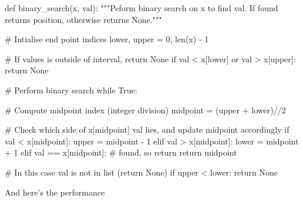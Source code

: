 \documentclass[
  letterpaper,
  DIV=11,
  numbers=noendperiod]{scrreprt}
\newenvironment{Shaded}{\begin{snugshade}}{\end{snugshade}}
\newcommand{\BuiltInTok}[1]{\textcolor[rgb]{0.00,0.23,0.31}{#1}}
\newcommand{\CommentTok}[1]{\textcolor[rgb]{0.37,0.37,0.37}{#1}}
\newcommand{\ControlFlowTok}[1]{\textcolor[rgb]{0.00,0.23,0.31}{#1}}
\newcommand{\DecValTok}[1]{\textcolor[rgb]{0.68,0.00,0.00}{#1}}
\newcommand{\KeywordTok}[1]{\textcolor[rgb]{0.00,0.23,0.31}{#1}}
\newcommand{\NormalTok}[1]{\textcolor[rgb]{0.00,0.23,0.31}{#1}}
\newcommand{\OperatorTok}[1]{\textcolor[rgb]{0.37,0.37,0.37}{#1}}
\newcommand{\VariableTok}[1]{\textcolor[rgb]{0.07,0.07,0.07}{#1}}
\theoremstyle{definition}
\theoremstyle{remark}
\begin{document}
\begin{Shaded}
\begin{Highlighting}[]
\KeywordTok{def}\NormalTok{ binary\_search(x, val):}
    \CommentTok{"""Peform binary search on x to find val. If found returns position, otherwise returns None."""}

    \CommentTok{\# Intialise end point indices}
\NormalTok{    lower, upper }\OperatorTok{=} \DecValTok{0}\NormalTok{, }\BuiltInTok{len}\NormalTok{(x) }\OperatorTok{{-}} \DecValTok{1}

    \CommentTok{\# If values is outside of interval, return None }
    \ControlFlowTok{if}\NormalTok{ val }\OperatorTok{\textless{}}\NormalTok{ x[lower] }\KeywordTok{or}\NormalTok{ val }\OperatorTok{\textgreater{}}\NormalTok{ x[upper]:}
        \ControlFlowTok{return} \VariableTok{None}

    \CommentTok{\# Perform binary search}
    \ControlFlowTok{while} \VariableTok{True}\NormalTok{:}
                
        \CommentTok{\# Compute midpoint index (integer division)}
\NormalTok{        midpoint }\OperatorTok{=}\NormalTok{ (upper }\OperatorTok{+}\NormalTok{ lower)}\OperatorTok{//}\DecValTok{2}

        \CommentTok{\# Check which side of x[midpoint] val lies, and update midpoint accordingly}
        \ControlFlowTok{if}\NormalTok{ val }\OperatorTok{\textless{}}\NormalTok{ x[midpoint]:}
\NormalTok{            upper }\OperatorTok{=}\NormalTok{ midpoint }\OperatorTok{{-}} \DecValTok{1}
        \ControlFlowTok{elif}\NormalTok{ val }\OperatorTok{\textgreater{}}\NormalTok{ x[midpoint]:}
\NormalTok{            lower }\OperatorTok{=}\NormalTok{ midpoint }\OperatorTok{+} \DecValTok{1}
        \ControlFlowTok{elif}\NormalTok{ val }\OperatorTok{==}\NormalTok{ x[midpoint]:  }\CommentTok{\# found, so return}
            \ControlFlowTok{return}\NormalTok{ midpoint}
       
        \CommentTok{\# In this case val is not in list (return None)}
        \ControlFlowTok{if}\NormalTok{ upper }\OperatorTok{\textless{}}\NormalTok{ lower:}
            \ControlFlowTok{return} \VariableTok{None}
\end{Highlighting}
\end{Shaded}

And here's the performance
\end{document}
